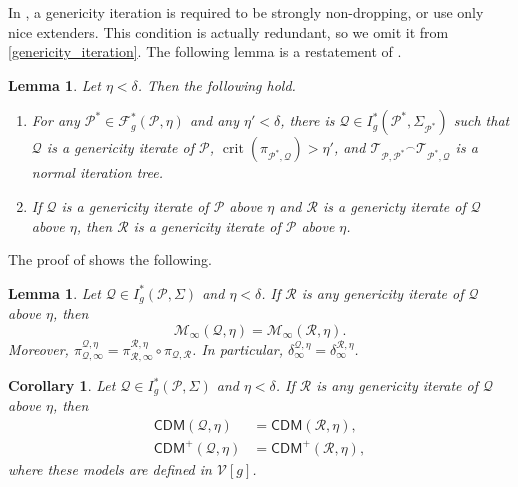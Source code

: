 \documentclass{amsart}
\newtheorem{lem}[dfn]{Lemma}
\newtheorem{cor}[dfn]{Corollary}
\DeclareMathOperator{\crit}{crit}
\begin{document}
In \cite{CoveringChang}, a genericity iteration is required to be strongly non-dropping, or use only nice extenders.
This condition is actually redundant, so we omit it from \cref{genericity_iteration}.
The following lemma is a restatement of \cite[Propositions 3.3 and 3.4]{CoveringChang}.

\begin{lem}\label{easy_lemma}
Let $\eta<\delta$. Then the following hold.
\begin{enumerate}
    \item For any $\mathcal{P}^*\in\mathcal{F}^*_{g}(\mathcal{P}, \eta)$ and any $\eta'<\delta$, there is $\mathcal{Q}\in I^*_{g}(\mathcal{P}^*, \Sigma_{\mathcal{P}^*})$ such that $\mathcal{Q}$ is a genericity iterate of $\mathcal{P}$, $\crit(\pi_{\mathcal{P}^*, \mathcal{Q}})>\eta'$, and $\mathcal{T}_{\mathcal{P}, \mathcal{P}^*}{}^{\frown}\mathcal{T}_{\mathcal{P}^*, \mathcal{Q}}$ is a normal iteration tree.
    \item If $\mathcal{Q}$ is a genericity iterate of $\mathcal{P}$ above $\eta$ and $\mathcal{R}$ is a genericty iterate of $\mathcal{Q}$ above $\eta$, then $\mathcal{R}$ is a genericity iterate of $\mathcal{P}$ above $\eta$.
\end{enumerate}
\end{lem}

The proof of \cite[Theorem 3.8]{CoveringChang} shows the following.

\begin{lem}\label{pres_of_M_infty}
    Let $\mathcal{Q}\in I^*_g(\mathcal{P}, \Sigma)$ and $\eta<\delta$.
    If $\mathcal{R}$ is any genericity iterate of $\mathcal{Q}$ above $\eta$, then
    \[
    \mathcal{M}_{\infty}(\mathcal{Q}, \eta)=\mathcal{M}_{\infty}(\mathcal{R}, \eta).
    \]
    Moreover, $\pi^{\mathcal{Q}, \eta}_{\mathcal{Q}, \infty}=\pi^{\mathcal{R}, \eta}_{\mathcal{R}, \infty}\circ\pi_{\mathcal{Q}, \mathcal{R}}$.
    In particular, $\delta^{\mathcal{Q}, \eta}_{\infty}=\delta^{\mathcal{R}, \eta}_{\infty}$.
\end{lem}

\begin{cor}\label{pres_of_CDM_plus}
    Let $\mathcal{Q}\in I^*_g(\mathcal{P}, \Sigma)$ and $\eta<\delta$.
    If $\mathcal{R}$ is any genericity iterate of $\mathcal{Q}$ above $\eta$, then
    \begin{align*}
        \mathsf{CDM}(\mathcal{Q}, \eta) &= \mathsf{CDM}(\mathcal{R}, \eta), \\
        \mathsf{CDM}^+(\mathcal{Q}, \eta) &= \mathsf{CDM}^+(\mathcal{R}, \eta),
    \end{align*}
    where these models are defined in $\mathcal{V}[g]$.
\end{cor}
\end{document}
